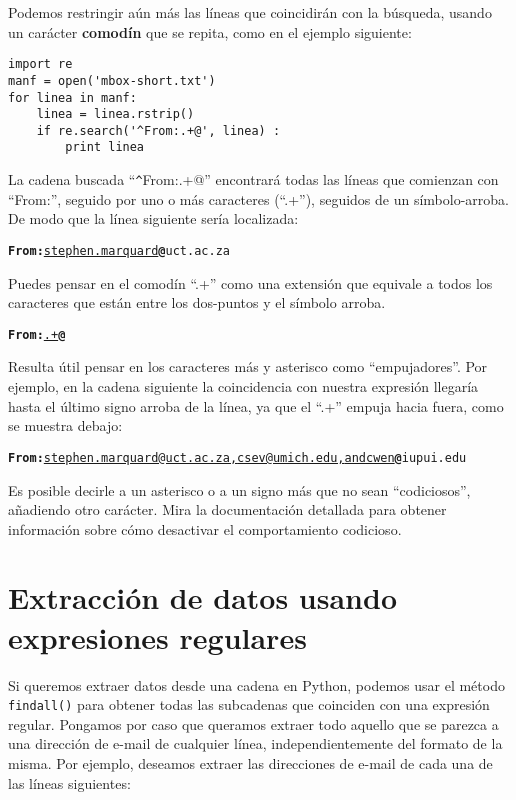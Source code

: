 Podemos restringir aún más las líneas que coincidirán con la búsqueda, usando un carácter {\bf comodín}
que se repita, como en el ejemplo siguiente:

\beforeverb
\begin{verbatim}
import re
manf = open('mbox-short.txt')
for linea in manf:
    linea = linea.rstrip()
    if re.search('^From:.+@', linea) :
        print linea
\end{verbatim}
\afterverb
%
La cadena buscada ``\verb"^"From:.+@'' encontrará todas las líneas que comienzan con ``From:'',
seguido por uno o más caracteres (``.+''), seguidos de un símbolo-arroba. De modo que la
línea siguiente sería localizada:

\beforeverb
\begin{alltt}
{\bf From:}\underline{ stephen.marquard}{\bf @}uct.ac.za
\end{alltt}
\afterverb

Puedes pensar en el comodín ``.+'' como una extensión que equivale a todos los caracteres
que están entre los dos-puntos y el símbolo arroba.

\beforeverb
\begin{alltt}
{\bf From:}\underline{.+}{\bf @}
\end{alltt}
\afterverb

Resulta útil pensar en los caracteres más y asterisco como ``empujadores''. Por ejemplo, en la cadena
siguiente la coincidencia con nuestra expresión llegaría hasta el último signo arroba de la línea,
ya que el ``.+'' empuja hacia fuera, como se muestra debajo:

\beforeverb
\begin{alltt}
{\bf From:}\underline{ stephen.marquard@uct.ac.za, csev@umich.edu, and cwen}{\bf @}iupui.edu
\end{alltt}
\afterverb

Es posible decirle a un asterisco o a un signo más que no sean ``codiciosos'', añadiendo
otro carácter. Mira la documentación detallada para obtener información sobre cómo desactivar
el comportamiento codicioso.

\section{Extracción de datos usando expresiones regulares}

Si queremos extraer datos desde una cadena en Python, podemos usar el método {\tt findall()} para
obtener todas las subcadenas que coinciden con una expresión regular. Pongamos por caso que
queramos extraer todo aquello que se parezca a una dirección de e-mail de cualquier línea, independientemente
del formato de la misma. Por ejemplo, deseamos extraer las direcciones de e-mail de cada una de las
líneas siguientes:

